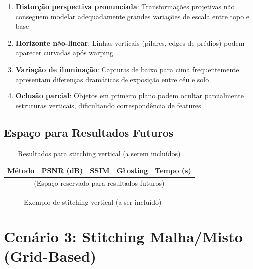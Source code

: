 \begin{enumerate}
    \item \textbf{Distorção perspectiva pronunciada}: Transformações projetivas não conseguem modelar adequadamente grandes variações de escala entre topo e base

    \item \textbf{Horizonte não-linear}: Linhas verticais (pilares, edges de prédios) podem aparecer curvadas após warping

    \item \textbf{Variação de iluminação}: Capturas de baixo para cima frequentemente apresentam diferenças dramáticas de exposição entre céu e solo

    \item \textbf{Oclusão parcial}: Objetos em primeiro plano podem ocultar parcialmente estruturas verticais, dificultando correspondência de features
\end{enumerate}

\subsection{Espaço para Resultados Futuros}

\begin{table}[htb]
\centering
\caption{Resultados para stitching vertical (a serem incluídos)}
\label{tab:vertical_results}
\small
\begin{tabular}{lcccc}
\hline
\textbf{Método} & \textbf{PSNR (dB)} & \textbf{SSIM} & \textbf{Ghosting} & \textbf{Tempo (s)} \\ \hline
\multicolumn{5}{c}{(Espaço reservado para resultados futuros)} \\
\hline
\end{tabular}
\end{table}

\begin{figure}[htb]
\centering
\caption{Exemplo de stitching vertical (a ser incluído)}
\label{fig:vertical_exemplo}
\end{figure}

\section{Cenário 3: Stitching Malha/Misto (Grid-Based)}
\label{sec:malha}

